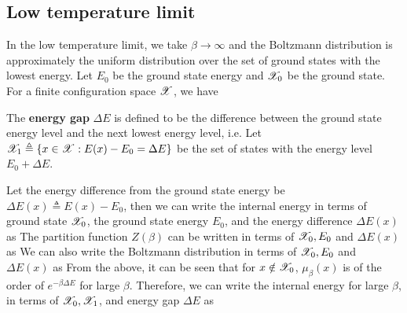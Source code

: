 \documentclass[letterpaper,english,10pt]{article}
\begin{document}
\subsection{Low temperature limit}
In the low temperature limit, we take $\beta \to \infty$ and the Boltzmann distribution is approximately the uniform distribution over the set of ground states with the lowest energy. 
Let $E_0$ be the ground state energy and $\mathscr{X}_0$ be the ground state. 
For a finite configuration space $\mathscr{X}$, we have 
\begin{defn}
The \textbf{energy gap} $\Delta E$ is defined to be the difference between the ground state energy level and the next lowest energy level, i.e.
Let $\mathscr{X}_1 \triangleq \{ x \in \mathscr{X} : E(x) - E_0 = \Delta E \}$ be the set of states with the energy level $E_0 + \Delta E$. 
\end{defn}
Let the energy difference from the ground state energy be $\Delta E(x) \triangleq E(x) - E_0$, 
then we can write the internal energy in terms of ground state $\mathscr{X}_0$, the ground state energy $E_0$, and the energy difference $\Delta E(x)$ as %
The partition function $Z(\beta)$ can be written in terms of $\mathscr{X}_0, E_0$ and $\Delta E(x)$ as
We can also write the Boltzmann distribution in terms of $\mathscr{X}_0, E_0$ and $\Delta E(x)$ as 
From the above, it can be seen that for $x \notin \mathscr{X}_0$, $\mu_\beta(x)$ is of the order of $e^{-\beta \Delta E}$ for large $\beta$.  
Therefore, we can write the internal energy for large $\beta$, in terms of $\mathscr{X}_0, \mathscr{X}_1$, and energy gap $\Delta E$ as 
\end{document}
